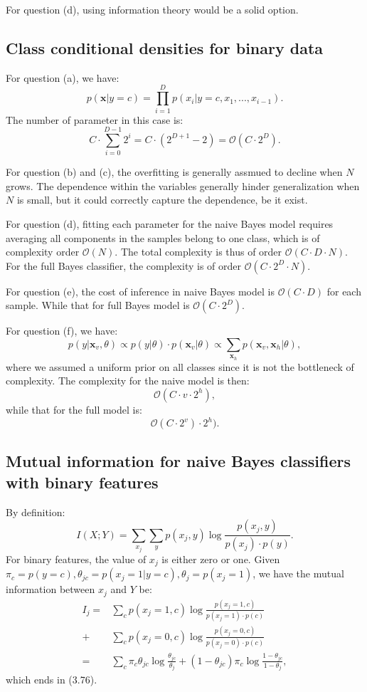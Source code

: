 \documentclass[UTF8]{ctexart}
\begin{document}
For question (d), using information theory would be a solid option.

\subsection{Class conditional densities for binary data}
For question (a), we have:
$$p(\textbf{x}|y=c)=\prod_{i=1}^{D}p(x_{i}|y=c,x_{1},...,x_{i-1}).$$
The number of parameter in this case is:
$$C\cdot \sum_{i=0}^{D-1}2^{i}=C\cdot(2^{D+1}-2) = \mathcal{O}(C\cdot 2^{D}).$$

For question (b) and (c), the overfitting is generally assmued to decline when $N$ grows.
The dependence within the variables generally hinder generalization when $N$ is small, but it could correctly capture the dependence, be it exist.

For question (d), fitting each parameter for the naive Bayes model requires averaging all components in the samples belong to one class, which is of complexity order $\mathcal{O}(N)$. The total complexity is thus of order $\mathcal{O}(C\cdot D\cdot N)$.
For the full Bayes classifier, the complexity is of order $\mathcal{O}(C\cdot 2^{D}\cdot N)$.

For question (e), the cost of inference in naive Bayes model is $\mathcal{O}(C\cdot D)$ for each sample.
While that for full Bayes model is $\mathcal{O}(C\cdot 2^{D})$.

For question (f), we have:
$$p(y|\textbf{x}_{v},\theta)\propto p(y|\theta)\cdot p(\textbf{x}_{v}|\theta)\propto\sum_{\textbf{x}_{h}}p(\textbf{x}_{v},\textbf{x}_{h}|\theta),$$
where we assumed a uniform prior on all classes since it is not the bottleneck of complexity.
The complexity for the naive model is then:
$$\mathcal{O}(C\cdot v\cdot 2^{h}),$$
while that for the full model is:
$$\mathcal{O}(C\cdot 2^{v})\cdot 2^{h}).$$


\subsection{Mutual information for naive Bayes classifiers with binary features}
By definition:
$$I(X;Y)=\sum_{x_{j}}\sum_{y}p(x_{j},y)\log \frac{p(x_{j},y)}{p(x_{j})\cdot p(y)}.$$
For binary features, the value of $x_{j}$ is either zero or one.
Given $\pi_{c}=p(y=c),\theta_{jc}=p(x_{j}=1|y=c),\theta_{j}=p(x_{j}=1)$, we have the mutual information between $x_{j}$ and $Y$ be:
\begin{align}
I_{j}=&\sum_{c}p(x_{j}=1,c)\log \frac{p(x_{j}=1,c)}{p(x_{j}=1)\cdot p(c)}\nonumber \\
 +& \sum_{c}p(x_{j}=0,c)\log \frac{p(x_{j}=0,c)}{p(x_{j}=0)\cdot p(c)} \nonumber \\
=&\sum_{c}\pi_{c}\theta_{jc} \log \frac{\theta_{jc}}{\theta_{j}} + (1-\theta_{jc})\pi_{c} \log \frac{1-\theta_{jc}}{1-\theta_{j}},\nonumber
\end{align}
which ends in (3.76).
\end{document}
